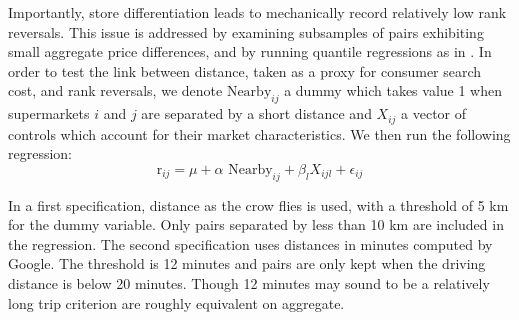 \documentclass[english]{article}
\begin{document}
Importantly, store differentiation leads to mechanically record relatively low rank reversals. This issue is addressed by examining subsamples of pairs exhibiting small aggregate price differences, and by running quantile regressions as in \cite{TAP11}. In order to test the link between distance, taken as a proxy for consumer search cost, and rank reversals, we denote $\text{Nearby}_{ij}$ a dummy which takes value 1 when supermarkets $i$ and $j$ are separated by a short distance and $X_{ij}$ a vector of controls which account for their market characteristics. We then run the following regression:
\begin{equation}
\text{r}_{ij}= \mu + \alpha {\text{ Nearby}_{ij}} + \beta_{l} X_{ijl} + \epsilon_{ij}
\end{equation}

In a first specification, distance as the crow flies is used, with a threshold of 5 km for the dummy variable. Only pairs separated by less than 10 km are included in the regression. The second specification uses distances in minutes computed by Google. The threshold is 12 minutes and pairs are only kept when the driving distance is below 20 minutes. Though 12 minutes may sound to be a relatively long trip criterion are roughly equivalent on aggregate.
\end{document}
